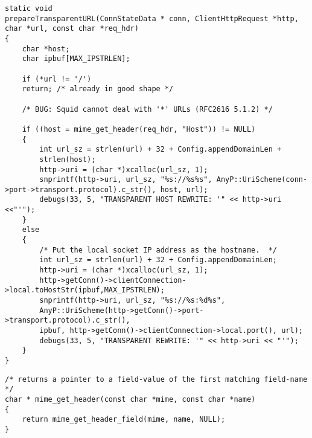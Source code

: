 \begin{lstlisting}[title=squid/src/client\_side.cc  line:2110 prepareTransparentURL()] 
static void
prepareTransparentURL(ConnStateData * conn, ClientHttpRequest *http, char *url, const char *req_hdr)
{
	char *host;
	char ipbuf[MAX_IPSTRLEN];
	
	if (*url != '/')
	return; /* already in good shape */
	
	/* BUG: Squid cannot deal with '*' URLs (RFC2616 5.1.2) */
	
	if ((host = mime_get_header(req_hdr, "Host")) != NULL) 
	{
		int url_sz = strlen(url) + 32 + Config.appendDomainLen +
		strlen(host);
		http->uri = (char *)xcalloc(url_sz, 1);
		snprintf(http->uri, url_sz, "%s://%s%s", AnyP::UriScheme(conn->port->transport.protocol).c_str(), host, url);
		debugs(33, 5, "TRANSPARENT HOST REWRITE: '" << http->uri <<"'");
	} 
	else 
	{
		/* Put the local socket IP address as the hostname.  */
		int url_sz = strlen(url) + 32 + Config.appendDomainLen;
		http->uri = (char *)xcalloc(url_sz, 1);
		http->getConn()->clientConnection->local.toHostStr(ipbuf,MAX_IPSTRLEN);
		snprintf(http->uri, url_sz, "%s://%s:%d%s",
		AnyP::UriScheme(http->getConn()->port->transport.protocol).c_str(),
		ipbuf, http->getConn()->clientConnection->local.port(), url);
		debugs(33, 5, "TRANSPARENT REWRITE: '" << http->uri << "'");
	}
}
\end{lstlisting}

\begin{lstlisting}[title=squid/src/mime\_header.cc  line:89]
/* returns a pointer to a field-value of the first matching field-name */
char * mime_get_header(const char *mime, const char *name)
{
	return mime_get_header_field(mime, name, NULL);
}
\end{lstlisting}


